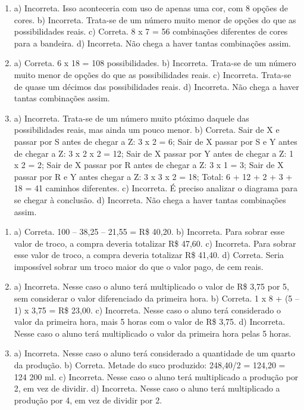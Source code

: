 
\begin{enumerate}
\item
a) Incorreta. Isso aconteceria com uso de apenas uma cor, com 8 opções de cores.
b) Incorreta. Trata-se de um número muito menor de opções do que as possibilidades reais.
c) Correta. 8 x 7 = 56 combinações diferentes de cores para a bandeira.
d) Incorreta. Não chega a haver tantas combinações assim.

\item
a) Correta. 6 x 18 = 108 possibilidades.
b) Incorreta. Trata-se de um número muito menor de opções do que as possibilidades reais.
c) Incorreta. Trata-se de quase um décimos das possibilidades reais.
d) Incorreta. Não chega a haver tantas combinações assim.

\item
a) Incorreta. Trata-se de um número muito ptóximo daquele das possibilidades reais, mas ainda um pouco menor.
b) Correta. 
Sair de X e passar por S antes de chegar a Z: 3 x 2 = 6;
Sair de X passar por S e Y antes de chegar a Z: 3 x 2 x 2 = 12;
Sair de X passar por Y antes de chegar a Z: 1 x 2 = 2;
Sair de X passar por R antes de chegar a Z: 3 x 1 = 3;
Sair de X passar por R e Y antes chegar a Z: 3 x 3 x 2 = 18;
Total: 6 + 12 + 2 + 3 + 18 = 41 caminhos diferentes.
c) Incorreta. É preciso analizar o diagrama para se chegar à conclusão.
d) Incorreta. Não chega a haver tantas combinações assim.
\end{enumerate}


\begin{enumerate}
\item
a) Correta. 100 -- 38,25 -- 21,55 = R\$ 40,20.
b) Incorreta. Para sobrar esse valor de troco, a compra deveria totalizar R\$ 47,60.
c) Incorreta. Para sobrar esse valor de troco, a compra deveria totalizar R\$ 41,40.
d) Correta. Seria impossível sobrar um troco maior do que o valor pago, de cem reais.

\item
a) Incorreta. Nesse caso o aluno terá multiplicado o valor de R\$ 3,75 por 5, sem considerar o valor diferenciado da primeira hora.
b) Correta. 1 x 8 + (5 -- 1) x 3,75 = R\$ 23,00.
c) Incorreta. Nesse caso o aluno terá considerado o valor da primeira hora, mais 5 horas com o valor de R\$ 3,75.
d) Incorreta. Nesse caso o aluno terá multiplicado o valor da primeira hora pelas 5 horas.

\item
a) Incorreta. Nesse caso o aluno terá considerado a quantidade de um quarto da produção.
b) Correta. Metade do suco produzido: 248,40/2 = 124,20 = 124 200 ml.
c) Incorreta. Nesse caso o aluno terá multiplicado a produção por 2, em vez de dividir.
d) Incorreta. Nesse caso o aluno terá multiplicado a produção por 4, em vez de dividir por 2.
\end{enumerate}

